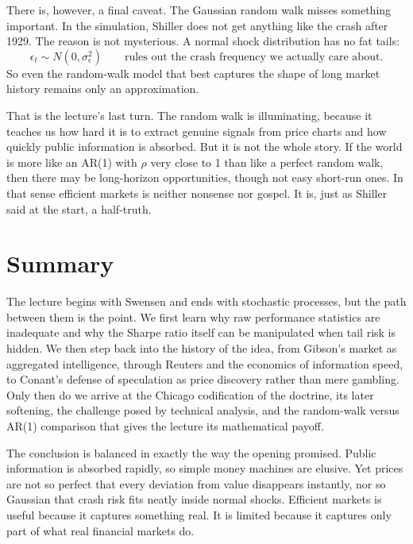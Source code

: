 There is, however, a final caveat. The Gaussian random walk misses something important. In the simulation, Shiller does not get anything like the crash after 1929. The reason is not mysterious. A normal shock distribution has no fat tails:
\begin{equation}
\epsilon_t \sim N(0,\sigma_\epsilon^2)
\qquad \text{rules out the crash frequency we actually care about.}
\end{equation}
So even the random-walk model that best captures the shape of long market history remains only an approximation.

That is the lecture's last turn. The random walk is illuminating, because it teaches us how hard it is to extract genuine signals from price charts and how quickly public information is absorbed. But it is not the whole story. If the world is more like an AR(1) with \(\rho\) very close to 1 than like a perfect random walk, then there may be long-horizon opportunities, though not easy short-run ones. In that sense efficient markets is neither nonsense nor gospel. It is, just as Shiller said at the start, a half-truth.

\section{Summary}

The lecture begins with Swensen and ends with stochastic processes, but the path between them is the point. We first learn why raw performance statistics are inadequate and why the Sharpe ratio itself can be manipulated when tail risk is hidden. We then step back into the history of the idea, from Gibson's market as aggregated intelligence, through Reuters and the economics of information speed, to Conant's defense of speculation as price discovery rather than mere gambling. Only then do we arrive at the Chicago codification of the doctrine, its later softening, the challenge posed by technical analysis, and the random-walk versus AR(1) comparison that gives the lecture its mathematical payoff.

The conclusion is balanced in exactly the way the opening promised. Public information is absorbed rapidly, so simple money machines are elusive. Yet prices are not so perfect that every deviation from value disappears instantly, nor so Gaussian that crash risk fits neatly inside normal shocks. Efficient markets is useful because it captures something real. It is limited because it captures only part of what real financial markets do.